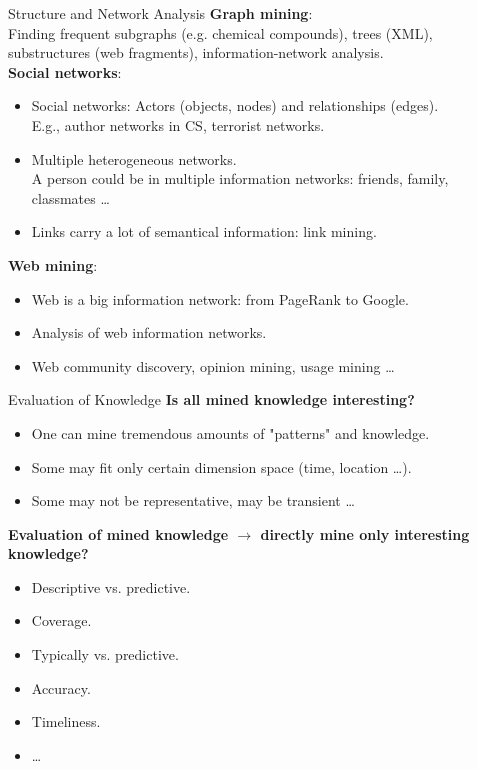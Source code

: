 \begin{frame}{Structure and Network Analysis}
	\textbf{Graph mining}:\\
	Finding frequent subgraphs (e.g. chemical compounds), trees (XML),
	substructures (web fragments), information-network analysis.\\[0.2cm]

	\textbf{Social networks}:
	\begin{itemize}
		\item Social networks: Actors (objects, nodes) and relationships
		      (edges).\\
		      E.g., author networks in CS, terrorist networks.
		\item Multiple heterogeneous networks.\\
		      A person could be in multiple information networks: friends, family,
		      classmates \ldots
		\item Links carry a lot of semantical information: link mining.
	\end{itemize}

	\textbf{Web mining}:
	\begin{itemize}
		\item Web is a big information network: from PageRank to Google.
		\item Analysis of web information networks.
		\item Web community discovery, opinion mining, usage mining \ldots
	\end{itemize}
\end{frame}

\begin{frame}{Evaluation of Knowledge}
	\textbf{Is all mined knowledge interesting?}
	\begin{itemize}
		\item One can mine tremendous amounts of "patterns" and knowledge.
		\item Some may fit only certain dimension space (time, location \ldots).
		\item Some may not be representative, may be transient \ldots
	\end{itemize}

	\textbf{Evaluation of mined knowledge $\rightarrow$ directly mine only
		interesting knowledge?}
	\begin{itemize}
		\item Descriptive vs. predictive.
		\item Coverage.
		\item Typically vs. predictive.
		\item Accuracy.
		\item Timeliness.
		\item \ldots
	\end{itemize}
\end{frame}
